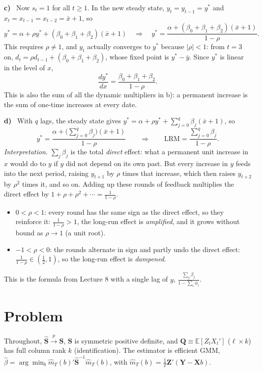 \documentclass[11pt]{article}
\newcommand{\E}{\mathbb{E}}
\newcommand{\symbf}[1]{\boldsymbol{#1}}
\newcounter{problem}
\renewcommand{\theproblem}{\arabic{problem}}
\newcommand{\problem}{
	\stepcounter{problem}
	\section*{Problem \theproblem}
}
\newcommand{\itm}[1]{\par\textbf{#1)}\ }
\begin{document}
\itm{c}
Now $s_t=1$ for all $t\ge1$. In the new steady state, $y_t=y_{t-1}=y^*$ and $x_t=x_{t-1}=x_{t-2}=\bar x+1$, so
\[
y^*=\alpha+\rho y^*+(\beta_0+\beta_1+\beta_2)(\bar x+1)\quad\Longrightarrow\quad y^*=\frac{\alpha+(\beta_0+\beta_1+\beta_2)(\bar x+1)}{1-\rho}.
\]
This requires $\rho\neq1$, and $y_t$ actually converges to $y^*$ because $|\rho|<1$: from $t=3$ on, $d_t=\rho d_{t-1}+(\beta_0+\beta_1+\beta_2)$, whose fixed point is $y^*-\bar y$. Since $y^*$ is linear in the level of $x$,
\[
\frac{dy^*}{dx}=\frac{\beta_0+\beta_1+\beta_2}{1-\rho}.
\]
This is also the sum of all the dynamic multipliers in b): a permanent increase is the sum of one-time increases at every date.

\itm{d}
With $q$ lags, the steady state gives $y^*=\alpha+\rho y^*+\sum_{j=0}^q\beta_j(\bar x+1)$, so
\[
y^*=\frac{\alpha+\big(\sum_{j=0}^q\beta_j\big)(\bar x+1)}{1-\rho}\qquad\Longrightarrow\qquad\text{LRM}=\frac{\sum_{j=0}^q\beta_j}{1-\rho}.
\]
\emph{Interpretation.} $\sum_j\beta_j$ is the total \emph{direct} effect: what a permanent unit increase in $x$ would do to $y$ if $y$ did not depend on its own past. But every increase in $y$ feeds into the next period, raising $y_{t+1}$ by $\rho$ times that increase, which then raises $y_{t+2}$ by $\rho^2$ times it, and so on. Adding up these rounds of feedback multiplies the direct effect by $1+\rho+\rho^2+\cdots=\frac1{1-\rho}$.
\begin{itemize}
	\item $0<\rho<1$: every round has the same sign as the direct effect, so they reinforce it: $\frac1{1-\rho}>1$, the long-run effect is \emph{amplified}, and it grows without bound as $\rho\to1$ (a unit root).
	\item $-1<\rho<0$: the rounds alternate in sign and partly undo the direct effect: $\frac1{1-\rho}\in(\frac12,1)$, so the long-run effect is \emph{dampened}.
\end{itemize}
This is the formula from Lecture 8 with a single lag of $y$, $\frac{\sum_j\beta_j}{1-\sum_i\phi_i}$.

\problem

Throughout, $\hat{\symbf S}\xrightarrow{p}\symbf S$, $\symbf S$ is symmetric positive definite, and $\symbf Q\equiv\E[Z_tX_t']$ ($\ell\times k$) has full column rank $k$ (identification). The estimator is efficient GMM, $\hat\beta=\arg\min_b\hat m_T(b)'\hat{\symbf S}^{-1}\hat m_T(b)$, with $\hat m_T(b)=\frac1T\symbf Z'(\symbf Y-\symbf Xb)$.
\end{document}
